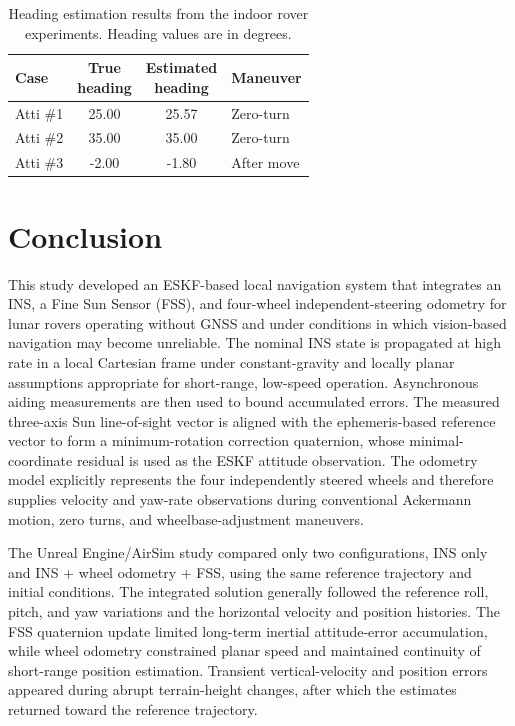 \documentclass[]{IAC_style}
\begin{document}
\begin{table}[H]
\centering
\caption{Heading estimation results from the indoor rover experiments. Heading values are in degrees.}
\label{tab:heading_results}
\scriptsize
\setlength{\tabcolsep}{3.2pt}
\renewcommand{\arraystretch}{1.10}
\begin{tabularx}{\columnwidth}{lcc>{\centering\arraybackslash}X}
\toprule
\textbf{Case} & \shortstack{\textbf{True}\\\textbf{heading}} & \shortstack{\textbf{Estimated}\\\textbf{heading}} & \textbf{Maneuver} \\
\midrule
Atti \#1 &  25.00 &  25.57 & Zero-turn \\
Atti \#2 &  35.00 &  35.00 & Zero-turn \\
Atti \#3 &  -2.00 &  -1.80 & After move \\
\bottomrule
\end{tabularx}
\end{table}

\FloatBarrier
\section{Conclusion}

This study developed an ESKF-based local navigation system that integrates an INS, a Fine Sun Sensor (FSS), and four-wheel independent-steering odometry for lunar rovers operating without GNSS and under conditions in which vision-based navigation may become unreliable. The nominal INS state is propagated at high rate in a local Cartesian frame under constant-gravity and locally planar assumptions appropriate for short-range, low-speed operation. Asynchronous aiding measurements are then used to bound accumulated errors. The measured three-axis Sun line-of-sight vector is aligned with the ephemeris-based reference vector to form a minimum-rotation correction quaternion, whose minimal-coordinate residual is used as the ESKF attitude observation. The odometry model explicitly represents the four independently steered wheels and therefore supplies velocity and yaw-rate observations during conventional Ackermann motion, zero turns, and wheelbase-adjustment maneuvers.

The Unreal Engine/AirSim study compared only two configurations, INS only and INS + wheel odometry + FSS, using the same reference trajectory and initial conditions. The integrated solution generally followed the reference roll, pitch, and yaw variations and the horizontal velocity and position histories. The FSS quaternion update limited long-term inertial attitude-error accumulation, while wheel odometry constrained planar speed and maintained continuity of short-range position estimation. Transient vertical-velocity and position errors appeared during abrupt terrain-height changes, after which the estimates returned toward the reference trajectory.
\end{document}
